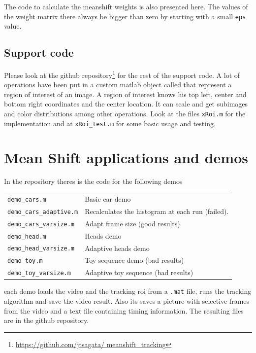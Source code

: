 \documentclass[a4paper,12pt]{article}
\begin{document}
\noindent The code to calculate the meanshift weights is also presented here. The values of the weight matrix there always be bigger than zero by starting with a small \texttt{eps} value.



\subsection{Support code}
Please look at the github repository\footnote{\url{https://github.com/jtsagata/ meanshift_tracking}} for the rest of the support code. A lot of operations have been put in a custom matlab object called  that represent a region of interest of an image. A region of interest knows his top left, center and bottom right coordinates and the center location. It can scale and get subimages and color distributions among other operations. Look at the files \texttt{xRoi.m} for the implementation and at \texttt{xRoi\_test.m} for some basic usage and testing.


\section{Mean Shift applications and demos}
In the repository theres is the code for the following demos 

\begin{tabular}[h]{l l}
	\texttt{demo\_cars.m} & Basic car demo\\
	\texttt{demo\_cars\_adaptive.m} & Recalculates the histogram at each run (failed).\\
	\texttt{demo\_cars\_varsize.m} & Adapt frame size (good results)\\  
	\texttt{demo\_head.m} & Heads demo \\
	\texttt{demo\_head\_varsize.m} & Adaptive heads demo\\
	\texttt{demo\_toy.m} & Toy sequence demo (bad results)\\
	\texttt{demo\_toy\_varsize.m} & Adaptive toy sequence (bad results) \\
\end{tabular}

\noindent each demo loads the video and the tracking roi from a \texttt{.mat} file, runs the tracking algorithm and save the video result. Also its saves a picture with selective frames from the video and a text file containing timing information. The resulting files are in the github repository.
\end{document}
